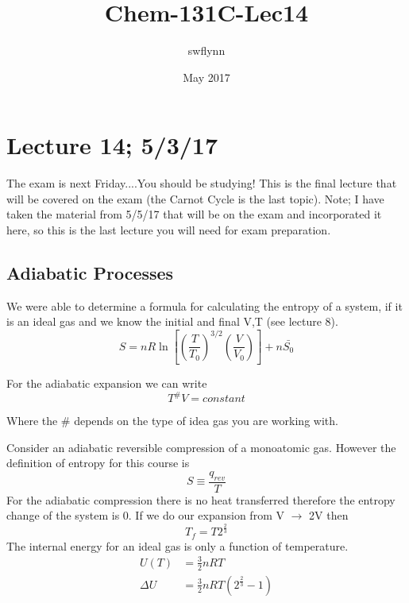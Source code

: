 \documentclass{article}
\title{Chem-131C-Lec14}
\author{swflynn }
\date{May 2017}
\begin{document}
\maketitle

\section*{Lecture 14; 5/3/17}
The exam is next Friday....You should be studying!
This is the final lecture that will be covered on the exam (the Carnot Cycle is the last topic). 
Note; I have taken the material from 5/5/17 that will be on the exam and incorporated it here, so this is the last lecture you will need for exam preparation.

\subsection*{Adiabatic Processes}
We were able to determine a formula for calculating the entropy of a system, if it is an ideal gas and we know the initial and final V,T (see lecture 8).
\begin{equation}
    S = nR\ln\left[ \left(\frac{T}{T_0} \right)^{3/2} \left(\frac{V}{V_0} \right) \right ] + n\bar{S_0}
\end{equation}

For the adiabatic expansion we can write 
\begin{equation}
    T^{\#}V = constant
\end{equation}

Where the \# depends on the type of idea gas you are working with.

Consider an adiabatic reversible compression of a monoatomic gas. 
However the definition of entropy for this course is
\begin{equation}
    S \equiv \frac{q_{rev}}{T}
\end{equation}
For the adiabatic compression there is no heat transferred therefore the entropy change of the system is 0. 
If we do our expansion from V $\rightarrow$ 2V then
\begin{equation}
    T_f = T2^{\frac{2}{3}}
\end{equation}
The internal energy for an ideal gas is only a function of temperature. 
\begin{equation}
\begin{split}
    U(T) &= \frac{3}{2}nRT \\
    \Delta U &= \frac{3}{2}nRT(2^{\frac{2}{3}}-1)
    \end{split}
\end{equation}
\end{document}
